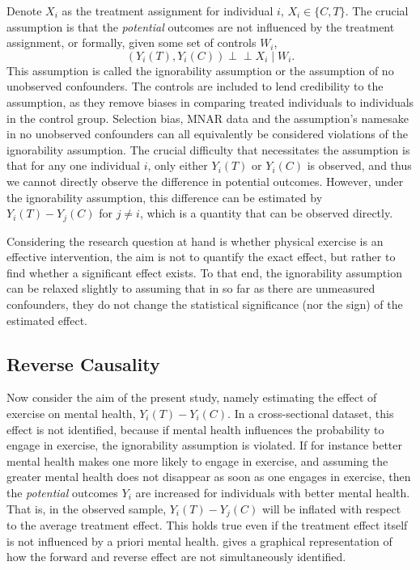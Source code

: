 Denote $X_i$ as the treatment assignment for individual $i$, $X_i \in \{C, T\}$. The crucial assumption is that the
\textit{potential} outcomes are not influenced by the treatment assignment, or formally, given some set of controls
$W_i$,
\begin{equation}
    \label{eq:methods:ignorability_assumption}
    (Y_i(T), Y_i(C)) \perp\!\!\!\perp X_i \mid W_i.
\end{equation}
This assumption is called the ignorability assumption or the assumption of no unobserved confounders.
The controls are included to lend credibility to the assumption, as they remove biases in comparing treated individuals
to individuals in the control group.
Selection bias, MNAR data and the assumption's namesake in no unobserved confounders can all equivalently be considered
violations of the ignorability assumption.
The crucial difficulty that necessitates the assumption is that for any one individual $i$,
only either $Y_i(T)$ or $Y_i(C)$ is observed, and thus we cannot directly observe the difference in potential outcomes.
However, under the ignorability assumption, this difference can be estimated by $Y_i(T) - Y_j(C)$ for $j \neq i$,
which is a quantity that can be observed directly.

Considering the research question at hand is whether physical exercise is an effective intervention, the aim is not to
quantify the exact effect, but rather to find whether a significant effect exists. To that end, the ignorability assumption
can be relaxed slightly to assuming that in so far as there are unmeasured confounders, they do not change the statistical
significance (nor the sign) of the estimated effect.

\subsection{Reverse Causality}
\label{sec:methods:reverse_causality}
Now consider the aim of the present study, namely estimating the effect of exercise on mental health, $Y_i(T) - Y_i(C)$.
In a cross-sectional dataset, this effect is not identified,
because if mental health influences the probability to engage in exercise, the ignorability assumption is violated.
If for instance better mental health makes one more likely to engage in exercise, and assuming the greater mental health
does not disappear as soon as one engages in exercise, then the \textit{potential} outcomes $Y_i$ are increased
for individuals with better mental health. That is, in the observed sample, $Y_i(T) - Y_j(C)$ will be inflated with respect to
the average treatment effect.
This holds true even if the treatment effect itself is not influenced by a priori mental health.
 gives a graphical representation of how the forward and reverse effect
are not simultaneously identified.


